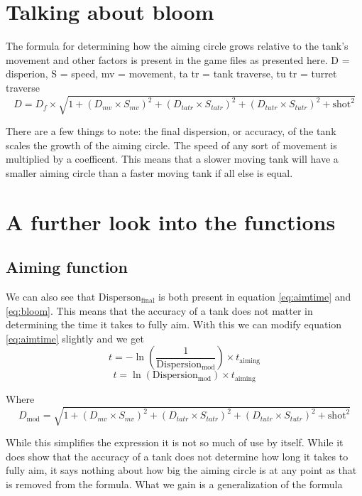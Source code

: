\documentclass{article}
\begin{document}
\section{Talking about bloom}
The formula for determining how the aiming circle grows relative to the tank's movement and other factors
is present in the game files as presented here.
D = disperion, S = speed, mv = movement, ta tr = tank traverse, tu tr = turret traverse
\begin{equation}
    \label{eq:bloom}
    D = D_{f} \times \sqrt{1 + \left(D_{mv}\times S_{mv}\right)^2 + \left(D_{ta tr}\times S_{ta tr}\right)^2
+ \left(D_{tu tr}\times S_{tu tr}\right)^2 + \mathrm{shot}^2}
\end{equation}

There are a few things to note: the final dispersion, or accuracy, of the tank scales the growth of the aiming circle.
The speed of any sort of movement is multiplied by a coefficent. This means that a slower moving tank will have a  smaller aiming circle than a faster moving tank if all else is equal.


\section{A further look into the functions}
\subsection{Aiming function}
We can also see that \(\mathrm{Disperson_{final}}\) is both present in equation \eqref{eq:aimtime} and \eqref{eq:bloom}.
This means that the accuracy of a tank does not matter in determining the time it takes to fully aim.
With this we can modify equation \eqref{eq:aimtime} slightly and we get 
\[t = - \ln \left(\frac{1}{\mathrm{Dispersion_{mod}}} \right) \times t_{\mathrm{aiming}}\]
\begin{equation} \label{eq:gen}
    t = \ln \left(\mathrm{Dispersion_{mod}}\right) \times t_{\mathrm{aiming}}
\end{equation}

Where \[D_{\mathrm{mod}} = \sqrt{1 + \left(D_{mv}\times S_{mv}\right)^2 + \left(D_{ta tr}\times S_{ta tr}\right)^2
+ \left(D_{tu tr}\times S_{tu tr}\right)^2 + \mathrm{shot}^2}\]

While this simplifies the expression it is not so much of use by itself. While it does show that
the accuracy of a tank does not determine how long it takes to fully aim, it says nothing about how big
the aiming circle is at any point as that is removed from the formula. What we gain is 
a generalization of the formula
\end{document}
